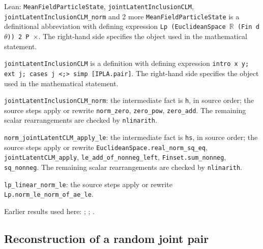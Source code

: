 \documentclass[11pt,a4paper]{report}
\begin{document}
\begin{leanbox}{Lean: \texttt{MeanFieldParticleState}, \texttt{jointLatentInclusionCLM}, \texttt{jointLatentInclusionCLM\_\allowbreak{}norm} and 2 more}
\texttt{Mean\allowbreak{}Field\allowbreak{}Particle\allowbreak{}State} is a definitional abbreviation with defining expression \texttt{Lp (Euclidean\allowbreak{}Space \ensuremath{\mathbb R} (Fin d\ensuremath{\theta})) 2 P \ensuremath{\times}}. The right-hand side specifies the object used in the mathematical statement.



\texttt{joint\allowbreak{}Latent\allowbreak{}Inclusion\allowbreak{}CLM} is a definition with defining expression \texttt{intro x y; ext j; cases j <;> simp [IPLA.\allowbreak{}pair]}. The right-hand side specifies the object used in the mathematical statement.



\texttt{joint\allowbreak{}Latent\allowbreak{}Inclusion\allowbreak{}CLM\_\allowbreak{}norm}: the intermediate fact is \texttt{h}, in source order; the source steps apply or rewrite \texttt{norm\_\allowbreak{}zero}, \texttt{zero\_\allowbreak{}pow}, \texttt{zero\_\allowbreak{}add}. The remaining scalar rearrangements are checked by \texttt{nlinarith}.



\texttt{norm\_\allowbreak{}joint\allowbreak{}Latent\allowbreak{}CLM\_\allowbreak{}apply\_\allowbreak{}le}: the intermediate fact is \texttt{hs}, in source order; the source steps apply or rewrite \texttt{Euclidean\allowbreak{}Space.\allowbreak{}real\_\allowbreak{}norm\_\allowbreak{}sq\_\allowbreak{}eq}, \texttt{joint\allowbreak{}Latent\allowbreak{}CLM\_\allowbreak{}apply}, \texttt{le\_\allowbreak{}add\_\allowbreak{}of\_\allowbreak{}nonneg\_\allowbreak{}left}, \texttt{Finset.\allowbreak{}sum\_\allowbreak{}nonneg}, \texttt{sq\_\allowbreak{}nonneg}. The remaining scalar rearrangements are checked by \texttt{nlinarith}.



\texttt{lp\_\allowbreak{}linear\_\allowbreak{}norm\_\allowbreak{}le}: the source steps apply or rewrite \texttt{Lp.\allowbreak{}norm\_\allowbreak{}le\_\allowbreak{}norm\_\allowbreak{}of\_\allowbreak{}ae\_\allowbreak{}le}.
\end{leanbox}


Earlier results used here: \cite[Section~3.1.1]{LangevinLean2026IPLA}; \cite[Section~3.3.1]{LangevinLean2026IPLA}; \cite[Section~3.9.1]{LangevinLean2026IPLA}.
\subsection{\texorpdfstring{Reconstruction of a random joint pair}{Reconstruction of a random joint pair}}
\label{report-step-ProximalLangevin-MeanFieldParticleDrift-lean-2}
\end{document}
